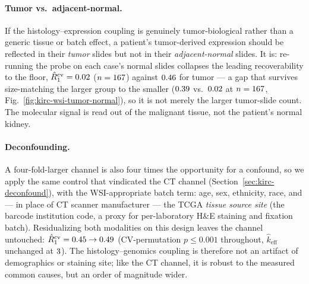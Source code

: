 \documentclass{article}
\begin{document}
\paragraph{Tumor vs.\ adjacent-normal.}
If the histology--expression coupling is genuinely tumor-biological rather than a
generic tissue or batch effect, a patient's tumor-derived expression should be
reflected in their \emph{tumor} slides but not in their \emph{adjacent-normal}
slides. It is: re-running the probe on each case's normal slides collapses the
leading recoverability to the floor, $\hat R_1^{\mathrm{cv}} = 0.02$
($n=167$) against $0.46$ for tumor --- a gap that survives
size-matching the larger group to the smaller ($0.39$ vs.\
$0.02$ at $n=167$, Fig.~\ref{fig:kirc-wsi-tumor-normal}), so
it is not merely the larger tumor-slide count. The molecular signal is read out
of the malignant tissue, not the patient's normal kidney.

\paragraph{Deconfounding.}
A four-fold-larger channel is also four times the opportunity for a confound, so
we apply the same control that vindicated the CT channel
(Section~\ref{sec:kirc-deconfound}), with the WSI-appropriate batch term: age,
sex, ethnicity, race, and --- in place of CT scanner manufacturer --- the TCGA
\emph{tissue source site} (the barcode institution code, a proxy for
per-laboratory H\&E staining and fixation batch). Residualizing both modalities on
this design leaves the channel untouched:
$\hat R_1^{\mathrm{cv}} = 0.45 \to 0.49$
(CV-permutation $p \le 0.001$ throughout, $\hat k_{\mathrm{eff}}$ unchanged at
$3$). The histology--genomics coupling is therefore not an artifact of
demographics or staining site; like the CT channel, it is robust to the measured
common causes, but an order of magnitude wider.
\end{document}

